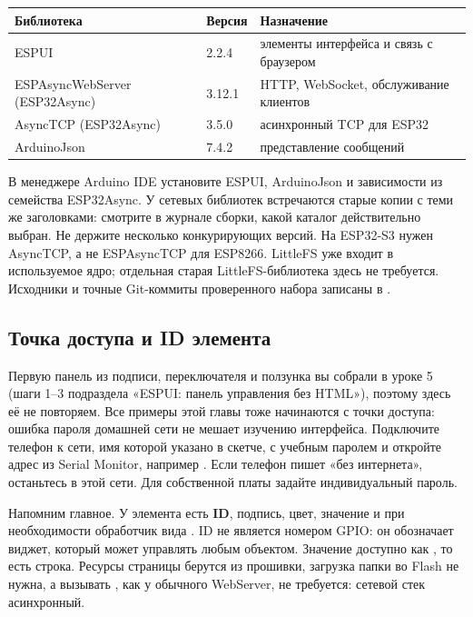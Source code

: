 \begin{center}\small
\begin{tabularx}{\textwidth}{@{}l l X@{}}
\toprule
Библиотека & Версия & Назначение\\
\midrule
ESPUI & 2.2.4 & элементы интерфейса и связь с браузером\\
ESPAsyncWebServer (ESP32Async) & 3.12.1 & HTTP, WebSocket, обслуживание клиентов\\
AsyncTCP (ESP32Async) & 3.5.0 & асинхронный TCP для ESP32\\
ArduinoJson & 7.4.2 & представление сообщений\\
\bottomrule
\end{tabularx}
\end{center}

В менеджере Arduino IDE установите ESPUI, ArduinoJson и зависимости из семейства ESP32Async.
У сетевых библиотек встречаются старые копии с теми же заголовками: смотрите в журнале сборки,
какой каталог действительно выбран. Не держите несколько конкурирующих версий.
На ESP32-S3 нужен AsyncTCP, а не ESPAsyncTCP для ESP8266.
LittleFS уже входит в используемое ядро; отдельная старая LittleFS-библиотека здесь не требуется.
Исходники и точные Git-коммиты проверенного набора записаны в
.

\subsection{Точка доступа и ID элемента}

Первую панель из подписи, переключателя и ползунка вы собрали в уроке 5 (шаги 1--3 подраздела
«ESPUI: панель управления без HTML»), поэтому здесь её не повторяем. Все примеры этой главы
тоже начинаются с точки доступа: ошибка пароля домашней сети не мешает изучению интерфейса.
Подключите телефон к сети, имя которой указано в скетче, с учебным паролем 
и откройте адрес из Serial Monitor, например . Если телефон пишет
«без интернета», останьтесь в этой сети. Для собственной платы задайте индивидуальный пароль.

Напомним главное. У элемента есть \textbf{ID}, подпись, цвет, значение и при необходимости обработчик
вида . ID не является номером GPIO: он обозначает
виджет, который может управлять любым объектом. Значение доступно как ,
то есть строка. Ресурсы страницы берутся из прошивки, загрузка папки  во Flash не нужна,
а вызывать , как у обычного WebServer, не требуется: сетевой стек асинхронный.

